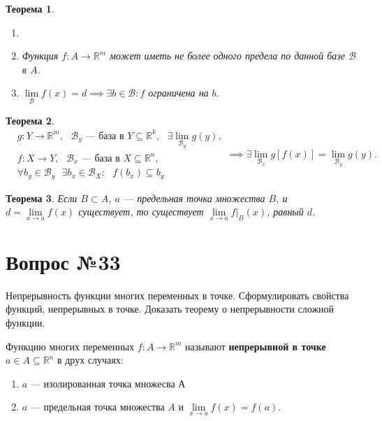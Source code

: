 \documentclass[12pt]{report}
\numberwithin{equation}{section}
\newtheorem{theorem}{Теорема}[section]
\begin{document}
\begin{theorem} \label{th:32:2}
\begin{enumerate}
\item[]
\item[а)] Функция $f : A \to \mathbb{R}^m$ может иметь не более одного предела по данной базе $\mathcal{B}$ в $A$.
\item[б)] $\lim\limits_{\mathcal{B}} f(x) = d \implies \exists b \in \mathcal{B} : f$ ограничена на $b$.
\end{enumerate}
\end{theorem}
\begin{theorem} \label{th:32:3}
\[\begin{aligned}
&g : Y \to \mathbb{R}^m,~~~ \mathcal{B}_y \text{ --- база в } Y \subseteq \mathbb{R}^k,~~~\exists \lim_{\mathcal{B}_y} g(y),\\
&f : X \to Y,~~~\mathcal{B}_x \text{ --- база в } X \subseteq \mathbb{R}^n,\\
&\forall b_y \in \mathcal{B}_y ~~~ \exists b_x \in \mathcal{B}_X : ~~~f(b_x) \subseteq b_y
\end{aligned} \implies \exists \lim_{\mathcal{B}_x}g[f(x)] = \lim_{\mathcal{B}_y} g(y).\]
\end{theorem}


\begin{theorem} \label{th:32:4}
Если $B \subset A$, $a$ --- предельная точка множества $B$, и $d = \lim\limits_{x \to a} f(x)$ существует, то существует $\lim\limits_{x \to a} f\big\vert_B(x)$, равный $d$.
\end{theorem}

\newpage \section{Вопрос №33} %
\begin{framed}
Непрерывность функции многих переменных в точке. Сформулировать свойства функций, непрерывных в точке. Доказать теорему о непрерывности сложной функции.
\end{framed}

Функцию многих переменных $f : A \to \mathbb{R}^m$ называют \textbf{непрерывной в точке} $a \in A \subseteq \mathbb{R}^n$ в друх случаях:
\begin{enumerate}
\item[1)] $a$ --- изолированная точка множесва А
\item[2)] $a$ --- предельная точка множества $A$ и $\lim\limits_{x \to a}f(x) = f(a).$
\end{enumerate}
\end{document}
